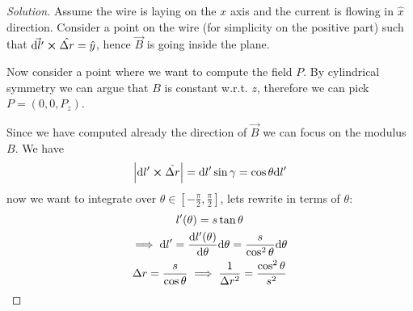\documentclass[12pt]{extarticle}
\begin{document}
\begin{proof}[Solution]
    Assume the wire is laying on the $x$ axis and the current is flowing in $\hat x$ direction.
    Consider a point on the wire (for simplicity on the positive part)
    such that $\vec{\dd l '} \cross \hat{\Delta r} = \hat y$,
    hence $\vec B$ is going inside the plane.

    Now consider a point where we want to compute the field $P$.
    By cylindrical symmetry we can argue that $B$ is constant w.r.t. $z$,
    therefore we can pick $P = (0, 0, P_z)$.

    \begin{figure}[H]
        \centering
    \end{figure}

    Since we have computed already the direction of $\vec B$ we can focus on the modulus $B$.
    We have
    \begin{equation}
        \abs{\dd l' \cross \hat{\Delta r}} = \dd l' \sin \gamma = \cos \theta \dd l'
    \end{equation}
    now we want to integrate over $\theta \in [-\frac{\pi}{2}, \frac{\pi}{2}]$,
    lets rewrite in terms of $\theta$:
    \begin{gather}
        l'(\theta) = s \tan \theta \\
        \implies \dd l' = \dv{l'(\theta)}{\theta} \dd \theta = \frac{s}{\cos ^2 \theta} \dd \theta \\
        \Delta r = \frac{s}{\cos \theta} \implies \frac{1}{\Delta r^2} = \frac{\cos ^2 \theta}{s^2}
    \end{gather}


\end{proof}
\end{document}
